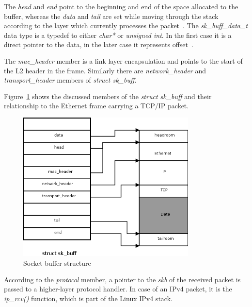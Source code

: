 The {\it{head}} and {\it{end}} point to the beginning and end of the space allocated to the buffer,
whereas the {\it{data}} and {\it{tail}} are set while moving through the stack according to the layer
which currently processes the packet~\cite{understanding-internals}.
The {\it{sk\_buff\_data\_t}} data type is a typedef to either {\it{char*}} or {\it{unsigned int}}.
In the first case it is a direct pointer to the data, in the later case it represents offset~\cite{kernel-source}.

The {\it{mac\_header}} member is a link layer encapsulation and points to the start of the L2 header in the frame.
Similarly there are {\it{network\_header}} and {\it{transport\_header}} members of {\it{struct sk\_buff}}.

Figure~\ref{fig:linux-skb} shows the discussed members of the {\it{struct sk\_buff}} and their relationship to the Ethernet
frame carrying a TCP/IP packet.

\begin{figure}[H]
	\centering
	\includegraphics[width=9cm,keepaspectratio]{fig/skb.png}
	\caption{Socket buffer structure}
	\label{fig:linux-skb}
	\bigskip
\end{figure}

According to the {\it{protocol}} member, a pointer to the {\it{skb}}
of the received packet is passed to a higher-layer protocol handler.
In case of an IPv4 packet, it is the {\it{ip\_rcv()}} function,
which is part of the Linux IPv4 stack.
